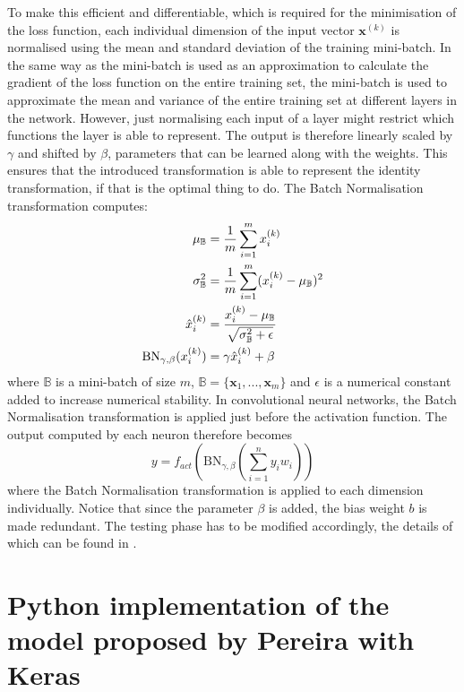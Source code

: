 \documentclass[12pt,a4paper,twoside,openright]{report}
\begin{document}
To make this efficient and differentiable, which is required for the minimisation of the loss function, each individual dimension of the input vector $\textbf{x}^{(k)}$ is normalised using the mean and standard deviation of the training mini-batch. In the same way as the mini-batch is used as an approximation to calculate the gradient of the loss function on the entire training set, the mini-batch is used to approximate the mean and variance of the entire training set at different layers in the network. However, just normalising each input of a layer might restrict which functions the layer is able to represent. The output is therefore linearly scaled by $\gamma$ and shifted by $\beta$, parameters that can be learned along with the weights. This ensures that the introduced transformation is able to represent the identity transformation, if that is the optimal thing to do. The Batch Normalisation transformation computes:
\begin{equation}
\begin{split}
	\mu_{\mathbb{B}}  & = \frac{1}{m}\sum_{i=1}^m x^{(k)}_i \\	
	\sigma^2_{\mathbb{B}}  & = \frac{1}{m}\sum_{i=1}^m (x^{(k)}_i - \mu_{\mathbb{B}})^2 \\	
	\hat{x}^{(k)}_i & = \cfrac{x^{(k)}_i - \mu_{\mathbb{B}}}{\sqrt{\sigma^2_{\mathbb{B}} + \epsilon}} \\
	\textrm{BN}_{\gamma, \beta}(x^{(k)}_i) & = \gamma \hat{x}^{(k)}_i + \beta
\end{split}
\end{equation}
where $\mathbb{B}$ is a mini-batch of size $m$, $\mathbb{B} = \{ \textbf{x}_1, ... , \textbf{x}_m \}$ and $\epsilon$ is a numerical constant added to increase numerical stability.
In convolutional neural networks, the Batch Normalisation transformation is applied just before the activation function. The output computed by each neuron therefore becomes
\begin{equation}
		y = f_{act}(\textrm{BN}_{\gamma, \beta}(\sum_{i=1}^{n} y_i w_i))
\end{equation}
where the Batch Normalisation transformation is applied to each dimension individually. Notice that since the parameter $\beta$ is added, the bias weight $b$ is made redundant. The testing phase has to be modified accordingly, the details of which can be found in \cite{batch_normalization}.

\chapter[Implementation of the model proposed by Pereira]{Python implementation of the model proposed by Pereira with Keras}
\label{appendix:pereira_model}
\end{document}
